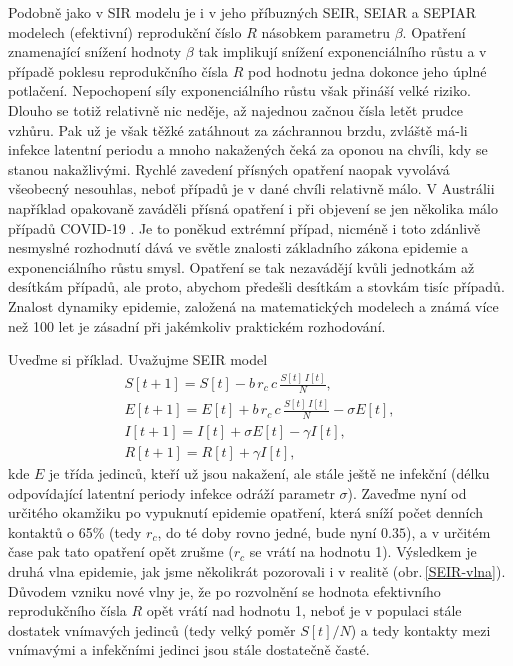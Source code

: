 Podobně jako v SIR modelu je i v jeho příbuzných SEIR, SEIAR a SEPIAR modelech (efektivní) reprodukční číslo $R$ násobkem parametru $\beta$. Opatření znamenající snížení hodnoty $\beta$ tak implikují snížení exponenciálního růstu a v případě poklesu reprodukčního čísla $R$ pod hodnotu jedna dokonce jeho úplné potlačení. Nepochopení síly exponenciálního růstu však přináší velké riziko. Dlouho se totiž relativně nic neděje, až najednou začnou čísla letět prudce vzhůru. Pak už je však těžké zatáhnout za záchrannou brzdu, zvláště má-li infekce latentní periodu a mnoho nakažených čeká za oponou na chvíli, kdy se stanou nakažlivými. Rychlé zavedení přísných opatření naopak vyvolává všeobecný nesouhlas, neboť případů je v dané chvíli relativně málo. V Austrálii například opakovaně zaváděli přísná opatření i při objevení se jen několika málo případů COVID-19 \cite{australia_opatreni}. Je to poněkud extrémní případ, nicméně i toto zdánlivě nesmyslné rozhodnutí dává ve světle znalosti základního zákona epidemie a exponenciálního růstu smysl. Opatření se tak nezavádějí kvůli jednotkám až desítkám případů, ale proto, abychom předešli desítkám a stovkám tisíc případů. Znalost dynamiky epidemie, založená na matematických modelech a známá více než 100 let je zásadní při jakémkoliv praktickém rozhodování.

Uveďme si příklad. Uvažujme SEIR model
\begin{equation}
	\begin{array}{l}
		\displaystyle{S[t+1] = S[t] - b\,r_c\,c \, \frac{S[t]\,I[t]}{N}}, \\[3ex]
		\displaystyle{E[t+1] = E[t] + b\,r_c\,c \, \frac{S[t]\,I[t]}{N} - \sigma E[t]}, \\[3ex]
		\displaystyle{I[t+1] = I[t] + \sigma E[t] - \gamma I[t]}, \\[3ex]
		\displaystyle{R[t+1] = R[t] + \gamma I[t]},
	\end{array}
	\label{SEIR1}
\end{equation}
kde $E$ je třída jedinců, kteří už jsou nakažení, ale stále ještě ne infekční (délku odpovídající latentní periody infekce odráží parametr $\sigma$). Zaveďme nyní od určitého okamžiku po vypuknutí epidemie opatření, která sníží počet denních kontaktů o 65\% (tedy $r_c$, do té doby rovno jedné, bude nyní $0.35$), a v určitém čase pak tato opatření opět zrušme ($r_c$ se vrátí na hodnotu 1). Výsledkem je druhá vlna epidemie, jak jsme několikrát pozorovali i v realitě (obr.\,\ref{SEIR-vlna}). Důvodem vzniku nové vlny je, že po rozvolnění se hodnota efektivního reprodukčního čísla $R$ opět vrátí nad hodnotu 1, neboť je v populaci stále dostatek vnímavých jedinců (tedy velký poměr $S[t]/N$) a tedy kontakty mezi vnímavými a infekčními jedinci jsou stále dostatečně časté.

